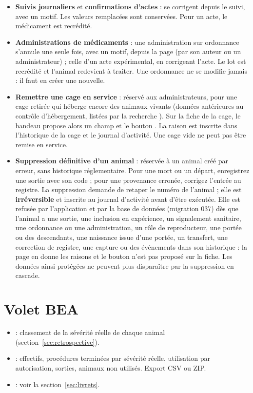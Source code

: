 \documentclass[11pt,a4paper]{article}
\begin{document}
\begin{itemize}
  \item \textbf{Suivis journaliers} et \textbf{confirmations d'actes} : se
    corrigent depuis le suivi, avec un motif. Les valeurs remplacées sont
    conservées. Pour un acte, le médicament est recrédité.
  \item \textbf{Administrations de médicaments} : une administration sur
    ordonnance s'annule une seule fois, avec un motif, depuis la page
     (par son auteur ou un administrateur) ; celle d'un
    acte expérimental, en corrigeant l'acte. Le lot est recrédité et
    l'animal redevient à traiter. Une ordonnance ne se modifie jamais : il
    faut en créer une nouvelle.
  \item \textbf{Remettre une cage en service} : réservé aux administrateurs,
    pour une cage retirée qui héberge encore des animaux vivants (données
    antérieures au contrôle d'hébergement, listées par la recherche
    ). Sur la fiche de la cage, le bandeau
     propose alors un champ  et le bouton
    . La raison est inscrite dans l'historique de
    la cage et le journal d'activité. Une cage vide ne peut pas être remise
    en service.
  \item \textbf{Suppression définitive d'un animal} : réservée à un animal
    créé par erreur, sans historique réglementaire. Pour une mort ou un
    départ, enregistrez une sortie avec son code ; pour une provenance
    erronée, corrigez l'entrée au registre. La suppression demande de retaper
    le numéro de l'animal ; elle est \textbf{irréversible} et inscrite au
    journal d'activité avant d'être exécutée. Elle est refusée par
    l'application et par la base de données (migration 037) dès que l'animal
    a une sortie, une inclusion en expérience, un signalement sanitaire, une
    ordonnance ou une administration, un rôle de reproducteur, une portée ou
    des descendants, une naissance issue d'une portée, un transfert, une
    correction de registre, une capture ou des événements dans son
    historique : la page en donne les raisons et le bouton n'est pas proposé
    sur la fiche. Les données ainsi protégées ne peuvent plus disparaître par
    la suppression en cascade.
\end{itemize}

\section{Volet BEA}\label{sec:bea}
\begin{itemize}
  \item {} : classement de la
    sévérité réelle de chaque animal (section~\ref{sec:retrospective}).
  \item {} :
    effectifs, procédures terminées par sévérité réelle, utilisation par
    autorisation, sorties, animaux non utilisés. Export CSV ou ZIP.
  \item {} : voir la
    section~\ref{sec:livrets}.
\end{itemize}
\end{document}
